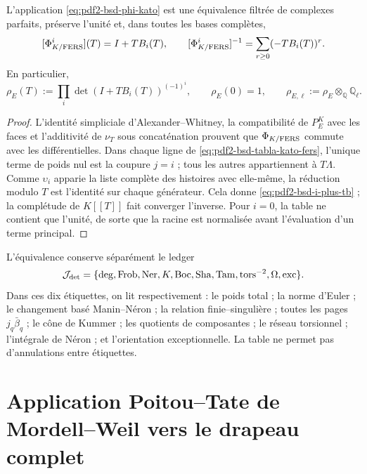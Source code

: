\begin{theorem}
\label{thm:pdf2-bsd-equivalencia-kato-fers}
L'application \eqref{eq:pdf2-bsd-phi-kato} est une équivalence filtrée de
complexes parfaits, préserve l'unité et, dans toutes les bases complètes,
\begin{equation}\label{eq:pdf2-bsd-i-plus-tb}
 [\Phi_{K/{\rm FERS}}^i](T)=I+TB_i(T),
 \qquad
 [\Phi_{K/{\rm FERS}}^i]^{-1}
 =\sum_{r\ge0}(-TB_i(T))^r.
\end{equation}
En particulier,
\begin{equation}\label{eq:pdf2-bsd-rho-uno}
 \rho_E(T):=
 \prod_i\det(I+TB_i(T))^{(-1)^i},
 \qquad \rho_E(0)=1,
 \qquad
 \rho_{E,\ell}:=\rho_E\otimes_{\mathbb Q}\mathbb Q_\ell.
\end{equation}
\end{theorem}

\begin{proof}
L'identité simpliciale d'Alexander--Whitney, la compatibilité de $P_E^K$
avec les faces et l'additivité de $\nu_T$ sous concaténation prouvent que
$\Phi_{K/{\rm FERS}}$ commute avec les différentielles. Dans chaque ligne de
\eqref{eq:pdf2-bsd-tabla-kato-fers}, l'unique terme de poids nul est la
coupure $j=i$ ; tous les autres appartiennent à $T\Lambda$. Comme
$\upsilon_i$ apparie la liste complète des histoires avec elle-même, la
réduction modulo $T$ est l'identité sur chaque générateur. Cela donne
\eqref{eq:pdf2-bsd-i-plus-tb} ; la complétude de $K[[T]]$ fait converger
l'inverse. Pour $i=0$, la table ne contient que l'unité, de sorte que la racine
est normalisée avant l'évaluation d'un terme principal.
\end{proof}

L'équivalence conserve séparément le ledger
\begin{equation}\label{eq:pdf2-bsd-ledger-diez}
 \mathcal J_{\rm det}=\{\deg,\operatorname{Frob},\operatorname{Ner},
 K,\operatorname{Boc},\operatorname{Sha},\operatorname{Tam},
 \operatorname{tors}^{-2},\Omega,\operatorname{exc}\}.
\end{equation}
Dans ces dix étiquettes, on lit respectivement : le poids total ; la norme
d'Euler ; le changement basé Manin--Néron ; la relation finie--singulière ; toutes les
pages $j_q\bar\beta_q$ ; le cône de Kummer ; les quotients de composantes ;
le réseau torsionnel ; l'intégrale de Néron ; et l'orientation exceptionnelle. La
table ne permet pas d'annulations entre étiquettes.

\section{Application Poitou--Tate de Mordell--Weil vers le drapeau complet}

